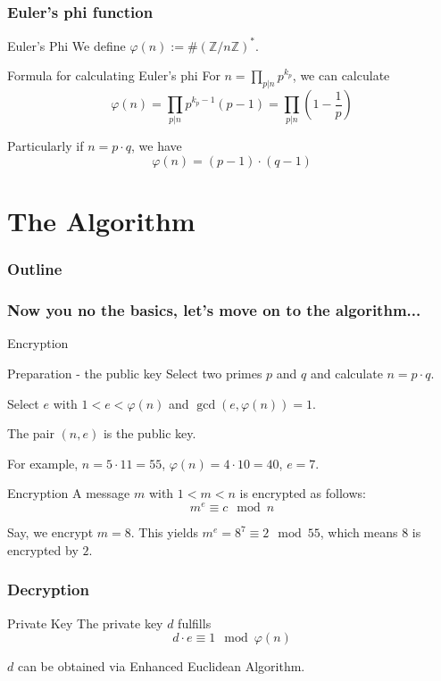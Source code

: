 \documentclass{beamer}
\begin{document}
\begin{frame}
\frametitle{Euler's phi function}
\begin{block}{Euler's Phi}
We define $\varphi(n):=\#\left(\mathbb{Z}/n\mathbb{Z}\right)^*$.
\end{block}\pause

\begin{block}{Formula for calculating Euler's phi}
For $n=\prod_{p|n}p^{k_p}$, we can calculate \[\varphi (n)=\prod_{p|n}p^{k_p-1}(p-1)=\prod_{p|n}\left(1-\frac{1}{p}\right)\] \pause

\end{block}
Particularly if $n=p\cdot q$, we have \[\varphi(n)=(p-1)\cdot (q-1)\]
\end{frame}
\section{The Algorithm}
\begin{frame}
\frametitle{Outline}
\tableofcontents
\end{frame}

\begin{frame}
\frametitle{Now you no the basics, let's move on to the algorithm...}
\begin{figure}
\end{figure}

\end{frame}

\begin{frame}{Encryption}
\begin{block}{Preparation - the public key}
Select two primes $p$ and $q$ and calculate $n=p\cdot q$.\pause

Select $e$ with $1<e<\varphi(n)$ and $\gcd(e,\varphi(n))=1$.\pause

The pair $(n,e)$ is the public key.\pause
\end{block}
For example, $n=5\cdot 11=55$, $\varphi(n)=4\cdot 10=40$, $e=7$.\pause
\begin{block}{Encryption}
A message $m$ with $1<m<n$ is encrypted as follows: \[m^e\equiv c \mod n\] \pause
\end{block}
Say, we encrypt $m=8$. This yields $m^e=8^7\equiv 2\mod 55$, which means $8$ is encrypted by $2$.
\end{frame}

\begin{frame}
\frametitle{Decryption}
\begin{block}{Private Key}
The private key $d$ fulfills \[d\cdot e\equiv 1\mod\varphi (n)\]
\end{block}
$d$ can be obtained via Enhanced Euclidean Algorithm.

\end{frame}
\end{document}
